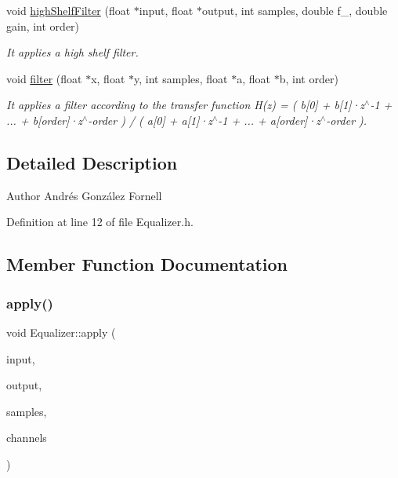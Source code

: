 \begin{DoxyCompactItemize}
void \hyperlink{class_equalizer_af1bbd593cf7943262d40c80f2869c932}{high\+Shelf\+Filter} (float $\ast$input, float $\ast$output, int samples, double f\+\_, double gain, int order)
\begin{DoxyCompactList}\small\item\em It applies a high shelf filter. \end{DoxyCompactList}\item 
void \hyperlink{class_equalizer_ad34a5bb0d644d3242147bf393ce84f02}{filter} (float $\ast$x, float $\ast$y, int samples, float $\ast$a, float $\ast$b, int order)
\begin{DoxyCompactList}\small\item\em It applies a filter according to the transfer function H(z) = ( b\mbox{[}0\mbox{]} + b\mbox{[}1\mbox{]}·z$^\wedge$-\/1 + ... + b\mbox{[}order\mbox{]}·z$^\wedge$-\/order ) / ( a\mbox{[}0\mbox{]} + a\mbox{[}1\mbox{]}·z$^\wedge$-\/1 + ... + a\mbox{[}order\mbox{]}·z$^\wedge$-\/order ). \end{DoxyCompactList}\end{DoxyCompactItemize}


\subsection{Detailed Description}
\begin{DoxyAuthor}{Author}
Andrés González Fornell 
\end{DoxyAuthor}


Definition at line 12 of file Equalizer.\+h.



\subsection{Member Function Documentation}
\mbox{\label{class_equalizer_ab58427efe27cc81be35410453a4158d6}} 
\subsubsection{\texorpdfstring{apply()}{apply()}}
{\footnotesize\ttfamily void Equalizer\+::apply (\begin{DoxyParamCaption}\item[{float $\ast$$\ast$}]{input,  }\item[{float $\ast$$\ast$}]{output,  }\item[{int}]{samples,  }\item[{std\+::vector$<$ \hyperlink{struct_s_a_c_bitstream_1_1_channel_type_a31c32b34085c06a1c58d920ca28c17c9}{S\+A\+C\+Bitstream\+::\+Channel\+Type\+::channeltype} $>$}]{channels }\end{DoxyParamCaption})}


